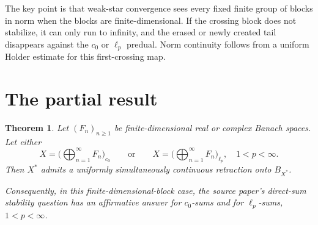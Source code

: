 \documentclass[11pt]{article}
\newtheorem{theorem}{Theorem}
\begin{document}
The key point is that weak-star convergence sees every fixed finite group of
blocks in norm when the blocks are finite-dimensional.  If the crossing block
does not stabilize, it can only run to infinity, and the erased or newly
created tail disappears against the \(c_0\) or \(\ell_p\) predual.  Norm
continuity follows from a uniform Holder estimate for this first-crossing
map.

\section*{The partial result}

\begin{theorem}
Let \((F_n)_{n\ge 1}\) be finite-dimensional real or complex Banach spaces.
Let either
\[
  X=\Big(\bigoplus_{n=1}^{\infty} F_n\Big)_{c_0}
  \qquad\text{or}\qquad
  X=\Big(\bigoplus_{n=1}^{\infty} F_n\Big)_{\ell_p},\quad 1<p<\infty .
\]
Then \(X^*\) admits a uniformly simultaneously continuous retraction onto
\(B_{X^*}\).

Consequently, in this finite-dimensional-block case, the source paper's
direct-sum stability question has an affirmative answer for \(c_0\)-sums and
for \(\ell_p\)-sums, \(1<p<\infty\).
\end{theorem}
\end{document}
